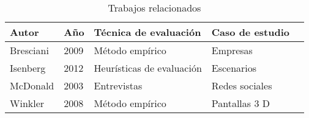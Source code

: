 \begin{table}[H]
\centering
\begin{tabular}{p{2cm} p{1cm} p{5cm} p{4cm} p{4cm}}
\hline
Autor & Año  & Técnica de evaluación & Caso de estudio \\
\hline \hline
Bresciani & 2009 & Método empírico & Empresas  \\
\hline
Isenberg & 2012  & Heurísticas de evaluación & Escenarios \\
\hline
McDonald & 2003 & Entrevistas  & Redes sociales  \\
\hline
Winkler  & 2008 & Método empírico  & Pantallas 3 D  \\
\hline
\end{tabular}
\caption{Trabajos relacionados}
\label{tabla:autores}
\end{table}
 

